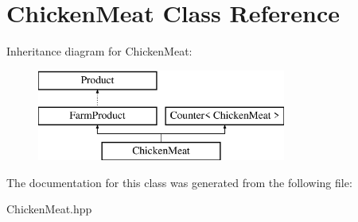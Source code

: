 \hypertarget{class_chicken_meat}{}\section{Chicken\+Meat Class Reference}
\label{class_chicken_meat}
Inheritance diagram for Chicken\+Meat\+:\begin{figure}[H]
\begin{center}
\leavevmode
\includegraphics[height=3.000000cm]{class_chicken_meat}
\end{center}
\end{figure}


The documentation for this class was generated from the following file\+:\begin{DoxyCompactItemize}
\item 
Chicken\+Meat.\+hpp\end{DoxyCompactItemize}
